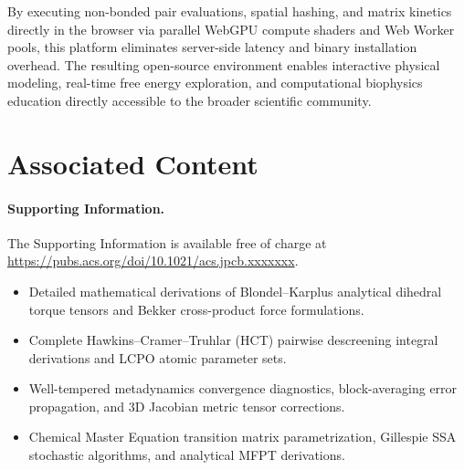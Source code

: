 \documentclass[journal=jpcbfk,manuscript=article]{achemso}
\begin{document}
By executing non-bonded pair evaluations, spatial hashing, and matrix kinetics directly in the browser via parallel WebGPU compute shaders and Web Worker pools, this platform eliminates server-side latency and binary installation overhead. The resulting open-source environment enables interactive physical modeling, real-time free energy exploration, and computational biophysics education directly accessible to the broader scientific community.

\section*{Associated Content}

\paragraph{Supporting Information.}
The Supporting Information is available free of charge at \url{https://pubs.acs.org/doi/10.1021/acs.jpcb.xxxxxxx}.
\begin{itemize}
\item Detailed mathematical derivations of Blondel--Karplus analytical dihedral torque tensors and Bekker cross-product force formulations.
\item Complete Hawkins--Cramer--Truhlar (HCT) pairwise descreening integral derivations and LCPO atomic parameter sets.
\item Well-tempered metadynamics convergence diagnostics, block-averaging error propagation, and 3D Jacobian metric tensor corrections.
\item Chemical Master Equation transition matrix parametrization, Gillespie SSA stochastic algorithms, and analytical MFPT derivations.
\end{itemize}
\end{document}
